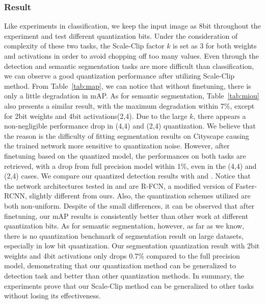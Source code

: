 \documentclass[letterpaper]{article} %
\begin{document}
\subsubsection{Result}
Like experiments in classification, we keep the input image as 8bit throughout the experiment and test different quantization bits. Under the consideration of complexity of these two tasks, the Scale-Clip factor $k$ is set as 3 for both weights and activations in order to avoid chopping off too many values. Even through the detection and semantic segmentation tasks are more difficult than classification, we can observe a good quantization  performance after utilizing Scale-Clip method. 
From Table~\ref{tab:map}, we can notice that without finetuning, there is only a little degradation in mAP. As for semantic segmentation, Table~\ref{tab:miou} also presents a similar result, with the maximum degradation within 7\%, except for 2bit weights and 4bit activations(2,4). 
Due to the large $k$, there appears a non-negligible performance drop in (4,4) and (2,4) quantization. We believe that the reason is the difficulty of fitting segmentation results on Cityscape causing the trained network more sensitive to quantization noise.
However, after finetuning based on the quantized model, the performances on both tasks are retrieved, with a drop from full precision model within 1\%, even in the (4,4) and (2,4) cases. We compare our quantized detection results with \cite{park2017weighted} and \cite{yin2016quantization}. Notice that the network architectures tested in \cite{park2017weighted} and \cite{yin2016quantization} are R-FCN, a modified version of Faster-RCNN, slightly different from ours. Also, the quantization schemes utilized are both non-uniform. Despite of the small differences, it can be observed that after finetuning, our mAP results is consistently better than other work at different quantization bits. As for semantic segmentation, however, as far as we know, there is no quantization benchmark of segmentation result on large datasets, especially in low bit quantization. Our segmentation quantization result with 2bit weights and 4bit activations only drops 0.7\% compared to the full precision model, demonstrating that our quantization method can be generalized to detection task and better than other quantization methods. In summary, the experiments prove that our Scale-Clip method can be generalized to other tasks without losing its effectiveness. 
\end{document}
